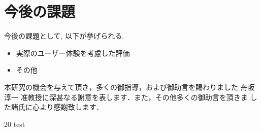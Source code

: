 \documentclass[a4j,12pt]{gradthesis_utf8}
\begin{document}
\chapter{今後の課題}\label{sec:sec7}
\hspace*{0.5em}今後の課題として, 以下が挙げられる.
\begin{itemize}
	\item 実際のユーザー体験を考慮した評価
	\item その他
\end{itemize}
\clearpage
%
\begin{acknowledgment}
 本研究の機会を与えて頂き，多くの御指導，および御助言を賜わりました
舟坂 淳一 准教授に深甚なる謝意を表します．また，その他多くの御助言を頂きま
した諸氏に心より感謝致します．
\end{acknowledgment}
\begin {thebibliography}{20} 
 test

\end {thebibliography}
\end{document}
